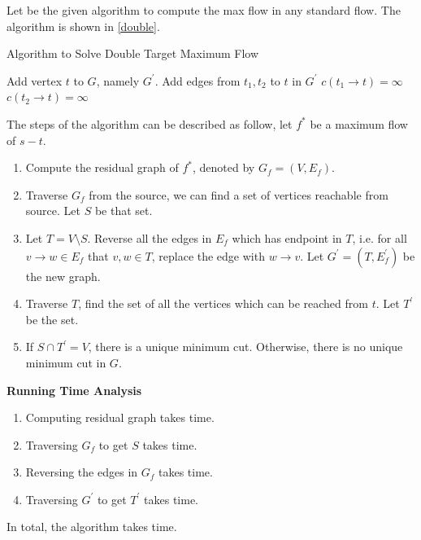 \documentclass[12pt,letterpaper,titlepage,en-US]{article}
\begin{document}
\begin{homeworkProblem}
\begin{homeworkSubProblem}
Let  be the given algorithm
to compute the max flow in any standard flow.
The algorithm is shown in \cref{double}.
\begin{algorithm}[H]
    \caption{Algorithm to Solve Double Target Maximum Flow}\label{double}
    \begin{algorithmic}[1]
            \State Add vertex $t$ to $G$, namely $G^\prime$. Add edges from $t_1,t_2$ to $t$ in $G^\prime$
            \State $c(t_1 \rightarrow t) = \infty$
            \State $c(t_2 \rightarrow t) = \infty$
            \Return {}
        \EndProcedure
    \end{algorithmic}
\end{algorithm}
\end{homeworkSubProblem}
\pagebreak
\begin{homeworkSubProblem}
    The steps of the algorithm can be described as follow, let $f^*$ be a maximum flow of $s-t$.
    \begin{enumerate}
        \item Compute the residual graph of $f^*$, denoted by $G_f = (V,E_f)$.
        \item Traverse $G_f$ from the source, we can find a set of vertices
            reachable from source. Let $S$ be that set.
        \item Let $T = V \setminus S$. Reverse all the edges in $E_f$ which has endpoint in $T$,
            i.e. for all $v \rightarrow w \in E_f$ that $v,w \in T$, replace the edge with $w \rightarrow v$.
            Let $G^\prime = (T,E_f^\prime)$ be the new graph.
        \item Traverse $T$, find the set of all the vertices which can be reached from $t$.
            Let $T^\prime$ be the set.
        \item If $S \cap T^\prime = V$, there is a unique minimum cut.
            Otherwise, there is no unique minimum cut in $G$.
    \end{enumerate}

    \vspace{0.1in}
    \noindent \textbf{Running Time Analysis}

    \begin{enumerate}
        \item Computing residual graph takes  time.
        \item Traversing $G_f$ to get $S$ takes  time.
        \item Reversing the edges in $G_f$ takes  time.
        \item Traversing $G^\prime$ to get $T^\prime$ takes  time.
    \end{enumerate}
    In total, the algorithm takes  time.

\end{homeworkSubProblem}
\end{homeworkProblem}
\end{document}
